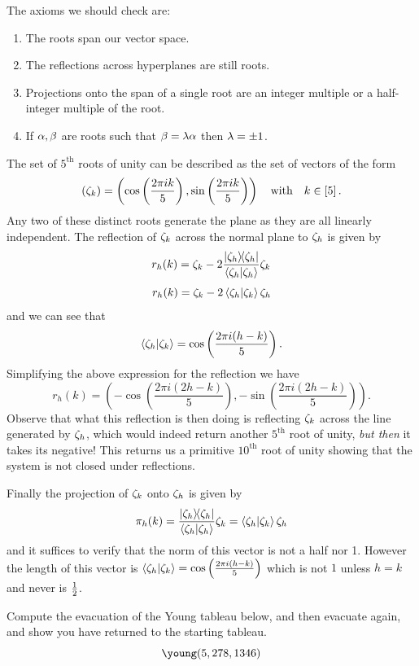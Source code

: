 \documentclass[12pt]{memoir}
\begin{document}
\begin{ptcbr}
    The axioms we should check are:
    \begin{enumerate}
        \item The roots span our vector space.
        \item The reflections across hyperplanes are still roots.
        \item Projections onto the span of a single root are an integer multiple or a half-integer multiple of the root.
        \item If $\alpha,\beta$ are roots such that $\beta=\lambda\alpha$ then $\lambda=\pm1$. 
    \end{enumerate}

    The set of $5^{\text{th}}$ roots of unity can be described as the set of vectors of the form $$(\zeta_k)=\left(\cos\left(\frac{2\pi ik}{5}\right),\sin\left(\frac{2\pi ik}{5}\right)\right)\quad\text{with}\quad k\in\left\lbrack5\right\rbrack.$$
    Any two of these distinct roots generate the plane as they are all linearly independent. The reflection of $\zeta_k$ across the normal plane to $\zeta_h$ is given by
    $$r_h(k)=\zeta_k-2\frac{\ketbra{\zeta_h}{\zeta_h}}{\braket{\zeta_h}{\zeta_h}}\zeta_k$$
    $$r_h(k)=\zeta_k-2\braket{\zeta_h}{\zeta_k}\zeta_h$$
    and we can see that 
    $$\braket{\zeta_h}{\zeta_k}=\cos\left(\frac{2\pi i(h-k)}{5}\right).$$
    Simplifying the above expression for the reflection we have 
    $$r_h(k)=\left(-\cos\left(\frac{2\pi i(2h-k)}{5}\right),-\sin\left(\frac{2\pi i(2h-k)}{5}\right)\right).$$
    Observe that what this reflection is then doing is reflecting $\zeta_k$ across the line generated by $\zeta_h$, which would indeed return another $5^{\text{th}}$ root of unity, \emph{but then} it takes its negative! This returns us a primitive $10^{\text{th}}$ root of unity showing that the system is not closed under reflections.\par
    Finally the projection of $\zeta_k$ onto $\zeta_h$ is given by 
    $$\pi_h(k)=\frac{\ketbra{\zeta_h}{\zeta_h}}{\braket{\zeta_h}{\zeta_h}}\zeta_k=\braket{\zeta_h}{\zeta_k}\zeta_h$$
    and it suffices to verify that the norm of this vector is not a half nor 1. However the length of this vector is $\braket{\zeta_h}{\zeta_k}=\cos\left(\frac{2\pi i(h-k)}{5}\right)$ which is not $1$ unless $h=k$ and never is $\half$.
\end{ptcbr}
\begin{Ej}
    Compute the evacuation of the Young tableau below, and then evacuate again, and show you have returned to the starting tableau.
    $$\young(5,278,1346)$$
\end{Ej}
\end{document}
